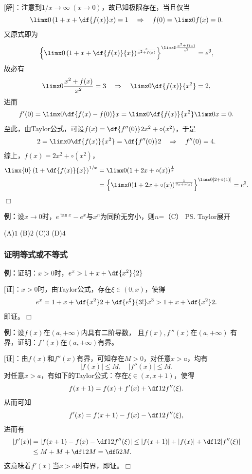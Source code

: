 [解]：注意到$1/x\to\infty\;(x\to0)$，故已知极限存在，当且仅当
$$\limx0\left(1+x+\df{f(x)}x\right)=1
\quad\Rightarrow\quad f(0)=\limx0f(x)=0.$$
又原式即为
$$\left\{\limx0\left(1+x+\df{f(x)}{x}\right)
^{\frac{x}{x^2+f(x)}}\right\}^{\limx0\frac{x^2+f(x)}{x^2}}=e^3,$$
故必有
$$\limx0\frac{x^2+f(x)}{x^2}=3\quad\Rightarrow\quad
\limx0\df{f(x)}{x^2}=2,$$
进而
$$f'(0)=\limx0\df{f(x)-f(0)}x=\limx0\df{f(x)}{x^2}\limx0x=0.$$
至此，由Taylor公式，可设$f(x)=\df{f''(0)}2x^2+\circ(x^2)$，于是
$$2=\limx0\df{f(x)}{x^2}=\df{f''(0)}2\quad\Rightarrow\quad
f''(0)=4.$$
综上，$f(x)=2x^2+\circ(x^2)$，
\begin{align}
	\limx{0}\left(1+\df{f(x)}{x}\right)^{1/x}
	&=\limx0(1+2x+\circ(x))^{\frac1x}\notag\\
	&=\left\{\limx0(1+2x+\circ(x))^{\frac1{2x+\circ(x)}}\right\}
	^{\limx0{[2+\circ(1)]}}=e^2.\notag	
\end{align}
\hfill$\Box$

{\bf 例：}设$x\to 0$时，$e^{\tan x}-e^x$与$x^n$为同阶无穷小，则$n$=（C）
\ps{Taylor展开}

\quad
(A)\;$1$\hspace{2cm}
(B)\;$2$\hspace{2cm}
(C)\;$3$\hspace{2cm}
(D)\;$4$ 

% 

\subsubsection{证明等式或不等式}

{\bf 例：}证明：$x>0$时，$e^x>1+x+\df{x^2}{2}$

[证]：$x>0$时，由Taylor公式，存在$\xi\in(0,x)$，使得
$$e^x=1+x+\df{x^2}2+\df{e^{\xi}}{3!}x^3>1+x+\df{x^2}2.$$
即证。\hfill$\Box$

{\bf 例：}设$f(x)$在$(a,+\infty)$内具有二阶导数，
且$f(x),f\,''(x)$在$(a,+\infty)$
有界，证明：$f\,'(x)$在$(a,+\infty)$有界。

[证]：由$f(x)$和$f''(x)$有界，可知存在$M>0$，对任意$x>a$，均有
$$|f(x)|\leq M,\quad |f''(x)|\leq M.$$
对任意$x>a$，有如下的Taylor公式：存在$\xi\in(x,x+1)$，使得
$$f(x+1)=f(x)+f'(x)+\df12f''(\xi).$$
从而可知
$$f'(x)=f(x+1)-f(x)-\df12f''(\xi),$$
进而有
\begin{align*}
	|f'(x)|&=|f(x+1)-f(x)-\df12f''(\xi)|
	\leq |f(x+1)|+|f(x)|+\df12|f''(\xi)|\\
	&\leq M+M+\df12M=\df52M.
\end{align*}
这意味着$f'(x)$当$x>a$时有界，即证。\hfill$\Box$

